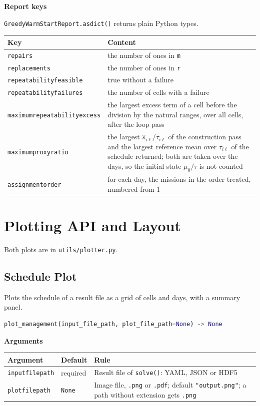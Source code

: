 \documentclass[11pt,a4paper]{article}
\makeatletter
\theoremstyle{plain}
\theoremstyle{definition}
\newcommand{\blockhead}[1]{\par\noindent\textbf{#1}\par\nobreak}
\renewcommand{\_}{\textunderscore\allowbreak{}}
\providecommand{\rejrow}[2]{{\raggedright #1\par} & {\raggedright #2\par} \\}
\providecommand{\typerow}[3]{{\raggedright #1\par} & {\raggedright #2\par} & {\raggedright #3\par} \\}
\providecommand{\tabstart}[2]{\begingroup\small\begin{longtable}{@{}#1@{}}\toprule #2 \\ \midrule \endhead}
\providecommand{\tabend}{\bottomrule\end{longtable}\endgroup}
\makeatother
\begin{document}
\blockhead{Report keys}
\texttt{GreedyWarmStartReport.as\_dict()} returns plain Python types.
\tabstart{p{5.2cm}p{9.8cm}}{Key & Content}
\rejrow{\texttt{repairs}}{the number of ones in \texttt{m}}
\rejrow{\texttt{replacements}}{the number of ones in \texttt{r}}
\rejrow{\texttt{repeatability\_feasible}}{true without a failure}
\rejrow{\texttt{repeatability\_failures}}{the number of cells with a failure}
\rejrow{\texttt{maximum\_repeatability\_excess}}{the largest excess term of a cell before the division by the natural ranges, over all cells, after the loop pass}
\rejrow{\texttt{maximum\_proxy\_ratio}}{the largest $\hat s_{i\ell}/\tau_{i\ell}$ of the construction pass and the largest reference mean over $\tau_{i\ell}$ of the schedule returned; both are taken over the days, so the initial state $\mu_0/\tau$ is not counted}
\rejrow{\texttt{assignment\_order}}{for each day, the missions in the order treated, numbered from $1$}
\tabend

\section{Plotting API and Layout}
\label{sec:plotting}

Both plots are in \texttt{utils/plotter.py}.

\subsection{Schedule Plot}

Plots the schedule of a result file as a grid of cells and days, with a summary panel.

\begin{lstlisting}[language=Python]
plot_management(input_file_path, plot_file_path=None) -> None
\end{lstlisting}

\blockhead{Arguments}
\tabstart{p{4.3cm}p{2.3cm}p{8.2cm}}{Argument & Default & Rule}
\typerow{\texttt{input\_file\_path}}{required}{Result file of \texttt{solve()}: YAML, JSON or HDF5}
\typerow{\texttt{plot\_file\_path}}{\texttt{None}}{Image file, \texttt{.png} or \texttt{.pdf}; default \texttt{"output.png"}; a path without extension gets \texttt{.png}}
\tabend
\end{document}
